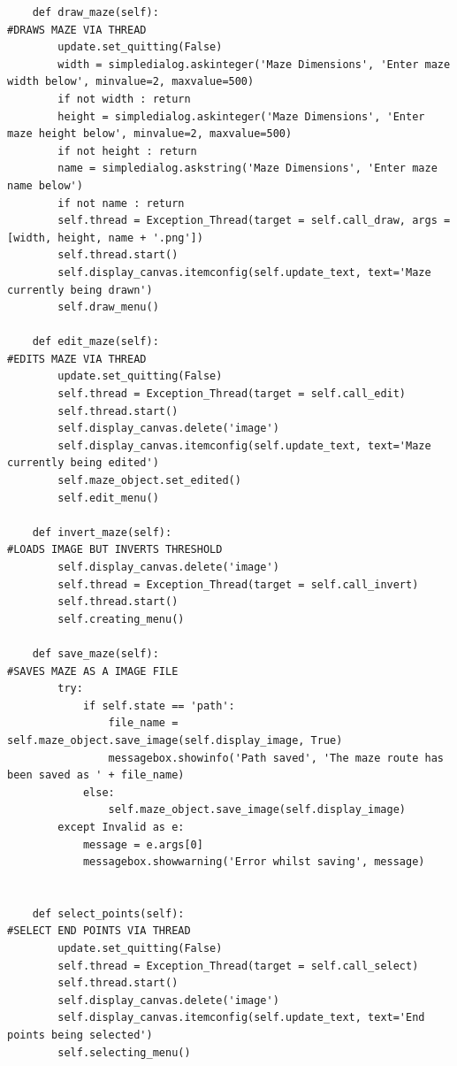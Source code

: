 \documentclass[titlepage]{article}
\begin{document}
\begin{changemargin}{-1in}{-1in}
\begin{verbatim}
    def draw_maze(self):                                                        #DRAWS MAZE VIA THREAD
        update.set_quitting(False)
        width = simpledialog.askinteger('Maze Dimensions', 'Enter maze width below', minvalue=2, maxvalue=500)
        if not width : return
        height = simpledialog.askinteger('Maze Dimensions', 'Enter maze height below', minvalue=2, maxvalue=500)
        if not height : return
        name = simpledialog.askstring('Maze Dimensions', 'Enter maze name below')
        if not name : return
        self.thread = Exception_Thread(target = self.call_draw, args = [width, height, name + '.png'])
        self.thread.start()
        self.display_canvas.itemconfig(self.update_text, text='Maze currently being drawn')
        self.draw_menu()

    def edit_maze(self):                                                        #EDITS MAZE VIA THREAD
        update.set_quitting(False)
        self.thread = Exception_Thread(target = self.call_edit)
        self.thread.start()
        self.display_canvas.delete('image')
        self.display_canvas.itemconfig(self.update_text, text='Maze currently being edited')
        self.maze_object.set_edited()
        self.edit_menu()

    def invert_maze(self):                                                      #LOADS IMAGE BUT INVERTS THRESHOLD
        self.display_canvas.delete('image')
        self.thread = Exception_Thread(target = self.call_invert)
        self.thread.start()
        self.creating_menu()

    def save_maze(self):                                                        #SAVES MAZE AS A IMAGE FILE
        try:
            if self.state == 'path':
                file_name = self.maze_object.save_image(self.display_image, True)
                messagebox.showinfo('Path saved', 'The maze route has been saved as ' + file_name)
            else:
                self.maze_object.save_image(self.display_image)
        except Invalid as e:
            message = e.args[0]
            messagebox.showwarning('Error whilst saving', message)

        
    def select_points(self):                                                    #SELECT END POINTS VIA THREAD
        update.set_quitting(False)
        self.thread = Exception_Thread(target = self.call_select)
        self.thread.start()
        self.display_canvas.delete('image')
        self.display_canvas.itemconfig(self.update_text, text='End points being selected')
        self.selecting_menu()


\end{verbatim}
\end{changemargin}
\end{document}
